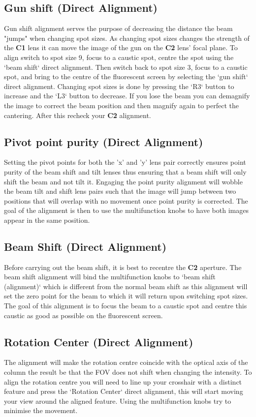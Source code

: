 \documentclass[a4paper]{scrartcl}
\begin{document}
\subsection*{Gun shift (Direct Alignment)}
Gun shift alignment serves the purpose of decreasing the distance the beam "jumps" when changing spot sizes. As changing spot sizes changes the strength of the \textbf{C1} lens it can move the image of the gun on the \textbf{C2} lens' focal plane. To align switch to spot size 9, focus to a caustic spot, centre the spot using the `beam shift` direct alignment. Then switch back to spot size 3, focus to a caustic spot, and bring to the centre of the fluorescent screen by selecting the `gun shift` direct alignment. Changing spot sizes is done by pressing the `R3` button to increase and the `L3` button to decrease. If you lose the beam you can demagnify the image to correct the beam position and then magnify again to perfect the cantering. After this recheck your \textbf{C2} alignment.

\subsection*{Pivot point purity (Direct Alignment)}
Setting the pivot points for both the 'x' and 'y' lens pair correctly ensures point purity of the beam shift and tilt lenses thus ensuring that a beam shift will only shift the beam and not tilt it. Engaging the point purity alignment will wobble the beam tilt and shift lens pairs such that the image will jump between two positions that will overlap with no movement once point purity is corrected. The goal of the alignment is then to use the multifunction knobs to have both images appear in the same position.

\subsection*{Beam Shift (Direct Alignment)}
Before carrying out the beam shift, it is best to recentre the \textbf{C2} aperture. The beam shift alignment will bind the multifunction knobs to `beam shift (alignment)` which is different from the normal beam shift as this alignment will set the zero point for the beam to which it will return upon switching spot sizes. The goal of this alignment is to focus the beam to a caustic spot and centre this caustic as good as possible on the fluorescent screen.

\subsection*{Rotation Center (Direct Alignment)}
The alignment will make the rotation centre coincide with the optical axis of the column the result be that the FOV does not shift when changing the intensity. To align the rotation centre you will need to line up your crosshair with a distinct feature and press the `Rotation Center` direct alignment, this will start moving your view around the aligned feature. Using the multifunction knobs try to minimise the movement.
\end{document}
